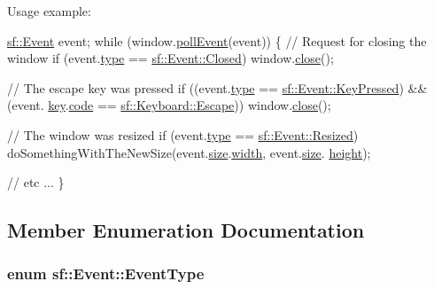 Usage example\-: 
\begin{DoxyCode}
\hyperlink{classsf_1_1_event}{sf::Event} event;
\textcolor{keywordflow}{while} (window.\hyperlink{classsf_1_1_window_a338e996585faf82e93069858e3b531b7}{pollEvent}(event))
\{
    \textcolor{comment}{// Request for closing the window}
    \textcolor{keywordflow}{if} (event.\hyperlink{classsf_1_1_event_adf2f8044f713fd9d6019077b0d1ffe0a}{type} == \hyperlink{classsf_1_1_event_af41fa9ed45c02449030699f671331d4aa4f718a7f43b0f2d46be222fe23198d9e}{sf::Event::Closed})
        window.\hyperlink{classsf_1_1_window_a99d1e030387b0c26f5995670504fe7b5}{close}();

    \textcolor{comment}{// The escape key was pressed}
    \textcolor{keywordflow}{if} ((event.\hyperlink{classsf_1_1_event_adf2f8044f713fd9d6019077b0d1ffe0a}{type} == \hyperlink{classsf_1_1_event_af41fa9ed45c02449030699f671331d4aaadc5747df45354b4d2c89558c3f0d1a4}{sf::Event::KeyPressed}) && (event.
      \hyperlink{classsf_1_1_event_a45b92fc6757ca7c193f06b302e424ab0}{key}.\hyperlink{structsf_1_1_event_1_1_key_event_a2879fdab8a68cb1c6ecc45730a2d0e61}{code} == \hyperlink{classsf_1_1_keyboard_acb4cacd7cc5802dec45724cf3314a142a72019ff9ecb145a9d3910177a49c757a}{sf::Keyboard::Escape}))
        window.\hyperlink{classsf_1_1_window_a99d1e030387b0c26f5995670504fe7b5}{close}();

    \textcolor{comment}{// The window was resized}
    \textcolor{keywordflow}{if} (event.\hyperlink{classsf_1_1_event_adf2f8044f713fd9d6019077b0d1ffe0a}{type} == \hyperlink{classsf_1_1_event_af41fa9ed45c02449030699f671331d4aac5a9f3d76cbf4a577fa982623f3198eb}{sf::Event::Resized})
        doSomethingWithTheNewSize(event.\hyperlink{classsf_1_1_event_a85dae56a377eeffd39183c3f6fc96cb9}{size}.\hyperlink{structsf_1_1_event_1_1_size_event_a20ea1b78c9bb1604432f8f0067bbfd94}{width}, event.\hyperlink{classsf_1_1_event_a85dae56a377eeffd39183c3f6fc96cb9}{size}.
      \hyperlink{structsf_1_1_event_1_1_size_event_af0f76a599d5f48189cb8d78d4e5facdb}{height});

    \textcolor{comment}{// etc ...}
\}
\end{DoxyCode}
 

\subsection{Member Enumeration Documentation}
\hypertarget{classsf_1_1_event_af41fa9ed45c02449030699f671331d4a}{
\subsubsection[{Event\-Type}]{\setlength{\rightskip}{0pt plus 5cm}enum {\bf sf\-::\-Event\-::\-Event\-Type}}}\label{classsf_1_1_event_af41fa9ed45c02449030699f671331d4a}


